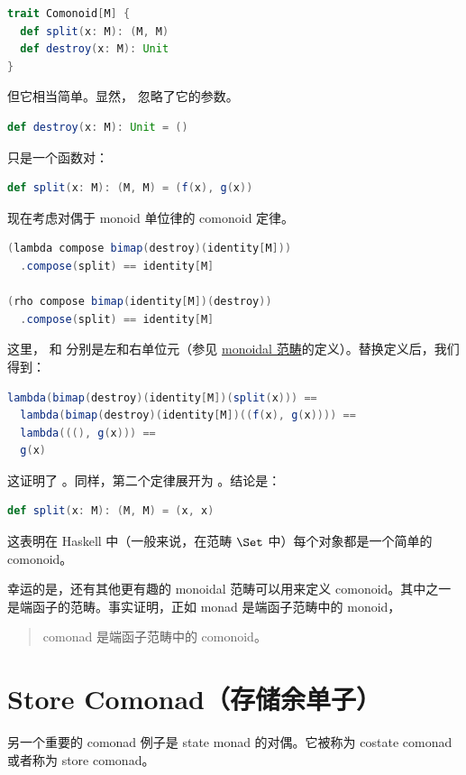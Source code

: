 \begin{lstlisting}[language=Scala]
trait Comonoid[M] {
  def split(x: M): (M, M)
  def destroy(x: M): Unit
}
\end{lstlisting}
但它相当简单。显然， 忽略了它的参数。

\begin{lstlisting}[language=Scala]
def destroy(x: M): Unit = ()
\end{lstlisting}
 只是一个函数对：

\begin{lstlisting}[language=Scala]
def split(x: M): (M, M) = (f(x), g(x))
\end{lstlisting}
现在考虑对偶于 monoid 单位律的 comonoid 定律。

\begin{lstlisting}[language=Scala]
(lambda compose bimap(destroy)(identity[M]))
  .compose(split) == identity[M]

(rho compose bimap(identity[M])(destroy))
  .compose(split) == identity[M]
\end{lstlisting}
这里， 和  分别是左和右单位元（参见 \hyperref[monads-categorically]{monoidal 范畴}的定义）。替换定义后，我们得到：

\begin{lstlisting}[language=Scala]
lambda(bimap(destroy)(identity[M])(split(x))) ==
  lambda(bimap(destroy)(identity[M])((f(x), g(x)))) ==
  lambda(((), g(x))) ==
  g(x)
\end{lstlisting}
这证明了 。同样，第二个定律展开为 。结论是：

\begin{lstlisting}[language=Scala]
def split(x: M): (M, M) = (x, x)
\end{lstlisting}
这表明在 Haskell 中（一般来说，在范畴 $\Set$ 中）每个对象都是一个简单的 comonoid。

幸运的是，还有其他更有趣的 monoidal 范畴可以用来定义 comonoid。其中之一是端函子的范畴。事实证明，正如 monad 是端函子范畴中的 monoid，

\begin{quote}
  comonad 是端函子范畴中的 comonoid。
\end{quote}

\section{Store Comonad（存储余单子）}

另一个重要的 comonad 例子是 state monad 的对偶。它被称为 costate comonad 或者称为 store comonad。

